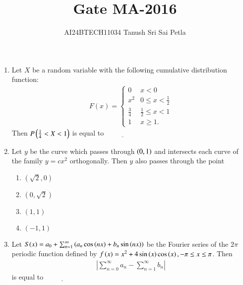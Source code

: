 \documentclass[journal]{IEEEtran}
\begin{document}

\vspace{3cm}


\renewcommand{\thefigure}{\theenumi}
\renewcommand{\thetable}{\theenumi}
\setlength{\intextsep}{10pt} %


\renewcommand{\thetable}{\theenumi}

\title{Gate MA-2016}
\author{AI24BTECH11034 Tanush Sri Sai Petla
}
\maketitle
\renewcommand{\thefigure}{\theenumi}
\renewcommand{\thetable}{\theenumi}
\begin{enumerate}[start=1]
\item Let $X$ be a random variable with the following cumulative distribution function:
\begin{align*}
F(x) = \begin{cases}
0 & x < 0 \\
x^2 & 0 \leq x < \frac{1}{2} \\
\frac{3}{4} & \frac{1}{2} \leq x < 1 \\
1 & x \geq 1.
\end{cases}
\end{align*}
Then $P\left(\frac{1}{4} < X < 1\right)$ is equal to $\underline{\hspace{2cm}}$\\

\item Let $y$ be the curve which passes through $\left(0,1\right)$ and intersects each curve of the family $y = cx^2$ orthogonally. Then $y$ also passes through the point
\begin{multicols}{2}
\begin{enumerate}
    \item $(\sqrt{2}, 0)$
    \item $(0, \sqrt{2})$
    \item $(1, 1)$
    \item $(-1, 1)$
\end{enumerate}
\end{multicols}

\item Let $S(x) = a_0 + \sum_{n=1}^{\infty}\left(a_n \cos\left(nx\right) + b_n \sin\left(nx\right)\right)$ be the Fourier series of the $2\pi$ periodic function defined by $f\left(x\right) = x^2 + 4\sin\left(x\right)\cos\left(x\right), -\pi \leq x \leq \pi$. Then 
\begin{align*}
\left|\sum_{n=0}^{\infty} a_n - \sum_{n=1}^{\infty} b_n \right|
\end{align*}
is equal to $\underline{\hspace{2cm}}$\\


\end{enumerate}
\end{document}
